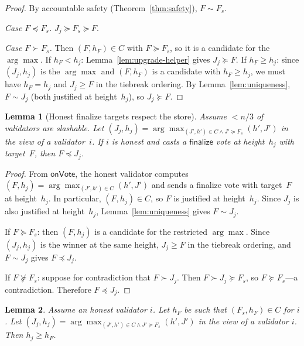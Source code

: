 \documentclass{article}
\newcommand{\finalize}{\mathsf{finalize}}
\theoremstyle{plain}
\newtheorem{lemma}{Lemma}
\theoremstyle{definition}
\theoremstyle{remark}
\begin{document}
\begin{proof}
By accountable safety (Theorem~\ref{thm:safety}), $F \sim F_s$.

\emph{Case $F \preceq F_s$.}
$J_j \succeq F_s \succeq F$.

\emph{Case $F \succ F_s$.}
Then $(F, h_F) \in C$ with $F \succeq F_s$, so it is a candidate for the $\arg\max$.
If $h_F < h_j$: Lemma~\ref{lem:upgrade-helper} gives $J_j \succeq F$.
If $h_F \geq h_j$: since $(J_j, h_j)$ is the $\arg\max$ and $(F, h_F)$ is a candidate with $h_F \geq h_j$, we must have $h_F = h_j$ and $J_j \geq F$ in the tiebreak ordering.
By Lemma~\ref{lem:uniqueness}, $F \sim J_j$ (both justified at height~$h_j$), so $J_j \succeq F$.
\end{proof}

\begin{lemma}[Honest finalize targets respect the store]\label{lem:honest-fin}
  Assume $< n/3$ of validators are slashable.
  Let $(J_j, h_j) = \arg\max_{(J',h')\in C \land J' \succeq F_s}(h', J')$ in the view of a validator~$i$.
  If $i$ is honest and casts a $\finalize$ vote at height~$h_j$ with target~$F$, then $F \preceq J_j$.
\end{lemma}

\begin{proof}
From $\textsf{onVote}$, the honest validator computes $(F, h_j) = \arg\max_{(J',h')\in C}(h', J')$ and sends a finalize vote with target~$F$ at height~$h_j$.
In particular, $(F, h_j) \in C$, so $F$ is justified at height~$h_j$.
Since $J_j$ is also justified at height~$h_j$, Lemma~\ref{lem:uniqueness} gives $F \sim J_j$.

If $F \succeq F_s$: then $(F, h_j)$ is a candidate for the restricted $\arg\max$.
Since $(J_j, h_j)$ is the winner at the same height, $J_j \geq F$ in the tiebreak ordering, and $F \sim J_j$ gives $F \preceq J_j$.

If $F \not\succeq F_s$: suppose for contradiction that $F \succ J_j$.
Then $F \succ J_j \succeq F_s$, so $F \succeq F_s$---a contradiction.
Therefore $F \preceq J_j$.
\end{proof}


\begin{lemma}
  Assume an honest validator $i$.
  Let $h_F$ be such that $(F_s, h_F) \in C$ for $i$.
  Let $(J_j, h_j) = \arg\max_{(J',h')\in C \land J' \succeq F_s}(h', J')$ in the view of a validator $i$.
  Then $h_j \geq h_F$.
\end{lemma}
\end{document}
